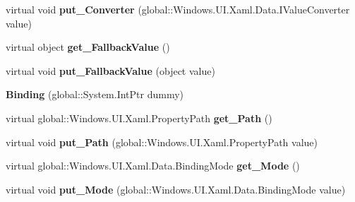 \begin{DoxyCompactItemize}
virtual void {\bfseries put\+\_\+\+Converter} (global\+::\+Windows.\+U\+I.\+Xaml.\+Data.\+I\+Value\+Converter value)
\item 
\mbox{\label{class_windows_1_1_u_i_1_1_xaml_1_1_data_1_1_binding_a907080aef9cb5f5df15684599707b3ba}} 
virtual object {\bfseries get\+\_\+\+Fallback\+Value} ()
\item 
\mbox{\label{class_windows_1_1_u_i_1_1_xaml_1_1_data_1_1_binding_ac1d4f41e87949cd4ffad38415709db6c}} 
virtual void {\bfseries put\+\_\+\+Fallback\+Value} (object value)
\item 
\mbox{\label{class_windows_1_1_u_i_1_1_xaml_1_1_data_1_1_binding_ae314033417c6ca80ae3826ead1750150}} 
{\bfseries Binding} (global\+::\+System.\+Int\+Ptr dummy)
\item 
\mbox{\label{class_windows_1_1_u_i_1_1_xaml_1_1_data_1_1_binding_a3670a1efb4d8824b1bc00bd91af01fc2}} 
virtual global\+::\+Windows.\+U\+I.\+Xaml.\+Property\+Path {\bfseries get\+\_\+\+Path} ()
\item 
\mbox{\label{class_windows_1_1_u_i_1_1_xaml_1_1_data_1_1_binding_a9f8d22b6891219f8db424a49a91ff24a}} 
virtual void {\bfseries put\+\_\+\+Path} (global\+::\+Windows.\+U\+I.\+Xaml.\+Property\+Path value)
\item 
\mbox{\label{class_windows_1_1_u_i_1_1_xaml_1_1_data_1_1_binding_ab0c392cb49f178e29a63d12a683e2c4f}} 
virtual global\+::\+Windows.\+U\+I.\+Xaml.\+Data.\+Binding\+Mode {\bfseries get\+\_\+\+Mode} ()
\item 
\mbox{\label{class_windows_1_1_u_i_1_1_xaml_1_1_data_1_1_binding_abc7d75756c9f93a8ec488cecb97265c5}} 
virtual void {\bfseries put\+\_\+\+Mode} (global\+::\+Windows.\+U\+I.\+Xaml.\+Data.\+Binding\+Mode value)
\item 
\mbox{\label{class_windows_1_1_u_i_1_1_xaml_1_1_data_1_1_binding_ac23f4899bbf0de1eaba1d8fc24e9f7c3}} 

\end{DoxyCompactItemize}
